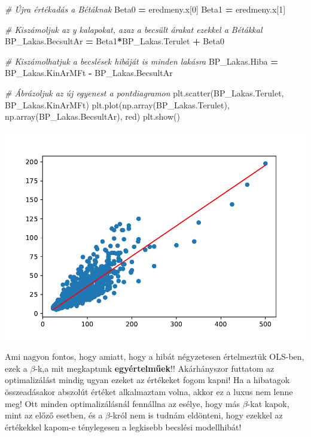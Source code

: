 \documentclass[
]{book}
\newenvironment{Shaded}{\begin{snugshade}}{\end{snugshade}}
\newcommand{\CommentTok}[1]{\textcolor[rgb]{0.56,0.35,0.01}{\textit{#1}}}
\newcommand{\DecValTok}[1]{\textcolor[rgb]{0.00,0.00,0.81}{#1}}
\newcommand{\NormalTok}[1]{#1}
\newcommand{\OperatorTok}[1]{\textcolor[rgb]{0.81,0.36,0.00}{\textbf{#1}}}
\newcommand{\StringTok}[1]{\textcolor[rgb]{0.31,0.60,0.02}{#1}}
\begin{document}
\begin{Shaded}
\begin{Highlighting}[]
\CommentTok{\# Újra értékadás a Bétáknak}
\NormalTok{Beta0 }\OperatorTok{=}\NormalTok{ eredmeny.x[}\DecValTok{0}\NormalTok{]}
\NormalTok{Beta1 }\OperatorTok{=}\NormalTok{ eredmeny.x[}\DecValTok{1}\NormalTok{]}

\CommentTok{\# Kiszámoljuk az y kalapokat, azaz a becsült árakat ezekkel a Bétákkal}
\NormalTok{BP\_Lakas.BecsultAr }\OperatorTok{=}\NormalTok{ Beta1}\OperatorTok{*}\NormalTok{BP\_Lakas.Terulet }\OperatorTok{+}\NormalTok{ Beta0}

\CommentTok{\# Kiszámolhatjuk a becslések hibáját is minden lakásra}
\NormalTok{BP\_Lakas.Hiba }\OperatorTok{=}\NormalTok{ BP\_Lakas.KinArMFt }\OperatorTok{{-}}\NormalTok{ BP\_Lakas.BecsultAr}

\CommentTok{\# Ábrázoljuk az új egyenest a pontdiagramon}
\NormalTok{plt.scatter(BP\_Lakas.Terulet, BP\_Lakas.KinArMFt)}
\NormalTok{plt.plot(np.array(BP\_Lakas.Terulet),}
\NormalTok{         np.array(BP\_Lakas.BecsultAr), }\StringTok{\textquotesingle{}red\textquotesingle{}}\NormalTok{)}
\NormalTok{plt.show()}
\end{Highlighting}
\end{Shaded}

\includegraphics{_main_files/figure-latex/unnamed-chunk-393-43.pdf}

Ami nagyon fontos, hogy amiatt, hogy a hibát négyzetesen értelmeztük OLS-ben, ezek a \(\beta\)-k,a mit megkaptunk \textbf{egyértelműek}!! Akárhányszor futtatom az optimalizálást mindig ugyan ezeket az értékeket fogom kapni! Ha a hibatagok összeadásakor abszolút értéket alkalmaztam volna, akkor ez a luxus nem lenne meg! Ott minden optimalizálásnál fennállna az esélye, hogy más \(\beta\)-kat kapok, mint az előző esetben, és a \(\beta\)-król nem is tudnám eldönteni, hogy ezekkel az értékekkel kapom-e ténylegesen a legkisebb becslési modellhibát!
\end{document}
